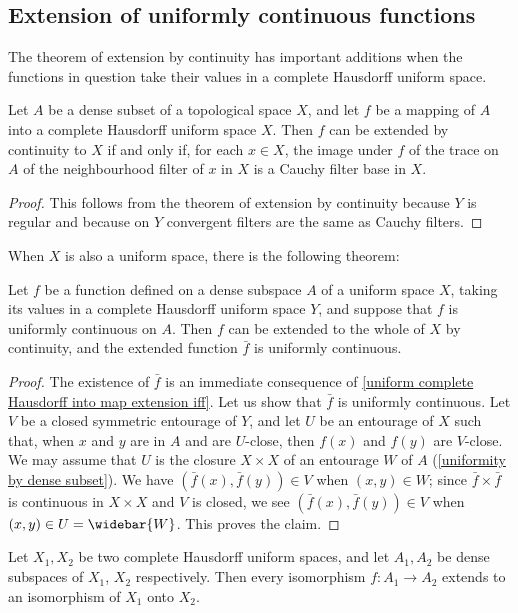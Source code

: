 \subsection{Extension of uniformly continuous functions}
The theorem of extension by continuity has important additions when the functions in question take their values in a complete Hausdorff uniform space.
\begin{theorem}\label{uniform complete Hausdorff into map extension iff}
Let $A$ be a dense subset of a topological space $X$, and let $f$ be a mapping of $A$ into a complete Hausdorff uniform space $X$. Then $f$ can be extended by continuity to $X$ if and only if, for each $x\in X$, the image under $f$ of the trace on $A$ of the neighbourhood filter of $x$ in $X$ is a Cauchy filter base in $X$.
\end{theorem}
\begin{proof}
This follows from the theorem of extension by continuity because $Y$ is regular and because on $Y$ convergent filters are the same as Cauchy filters.
\end{proof}
When $X$ is also a uniform space, there is the following theorem:
\begin{theorem}\label{uniform space complete dense map extension}
Let $f$ be a function defined on a dense subspace $A$ of a uniform space $X$, taking its values in a complete Hausdorff uniform space $Y$, and suppose that $f$ is uniformly continuous on $A$. Then $f$ can be extended to the whole of $X$ by continuity, and the extended function $\bar{f}$ is uniformly continuous.
\end{theorem}
\begin{proof}
The existence of $\bar{f}$ is an immediate consequence of \cref{uniform complete Hausdorff into map extension iff}. Let us show that $\bar{f}$ is uniformly continuous. Let $V$ be a closed symmetric entourage of $Y$, and let $U$ be an entourage of $X$ such that, when $x$ and $y$ are in $A$ and are $U$-close, then $f(x)$ and $f(y)$ are $V$-close. We may assume that $U$ is the closure $X\times X$ of an entourage $W$ of $A$ (\cref{uniformity by dense subset}). We have $(\bar{f}(x),\bar{f}(y))\in V$ when $(x,y)\in W$; since $\bar{f}\times\bar{f}$ is continuous in $X\times X$ and $V$ is closed, we see $(\bar{f}(x),\bar{f}(y))\in V$ when $(x,y)\in U=\widebar{W}$. This proves the claim.
\end{proof}
\begin{corollary}\label{complete space isomorphism on dense extend}
Let $X_1,X_2$ be two complete Hausdorff uniform spaces, and let $A_1,A_2$ be dense subspaces of $X_1$, $X_2$ respectively. Then every isomorphism
$f:A_1\to A_2$ extends to an isomorphism of $X_1$ onto $X_2$.
\end{corollary}
